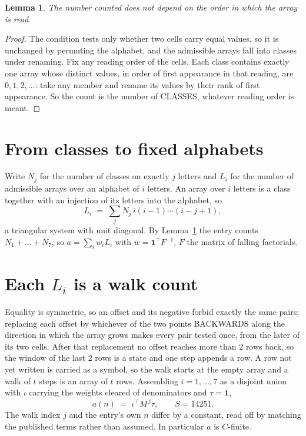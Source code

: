 \documentclass[11pt,a4paper]{article}
\theoremstyle{plain}
\newtheorem{lemma}[theorem]{Lemma}
\theoremstyle{definition}
\begin{document}
\begin{lemma}\label{lem:order}
The number counted does not depend on the order in which the array is read.
\end{lemma}

\begin{proof}
The condition tests only whether two cells carry equal values, so it is unchanged by permuting
the alphabet, and the admissible arrays fall into classes under renaming. Fix any reading order
of the cells. Each class contains exactly one array whose distinct values, in order of first
appearance in that reading, are $0,1,2,\dots$: take any member and rename its values by their
rank of first appearance. So the count is the number of CLASSES, whatever reading order is
meant.
\end{proof}

\section{From classes to fixed alphabets}

Write $N_j$ for the number of classes on exactly $j$ letters and $L_i$ for the number of
admissible arrays over an alphabet of $i$ letters. An array over $i$ letters is a class together
with an injection of its letters into the alphabet, so
\[
L_i\;=\;\sum_j N_j\,i(i-1)\cdots(i-j+1),
\]
a triangular system with unit diagonal. By Lemma~\ref{lem:order} the entry counts
$N_1+\dots+N_{7}$, so $a=\sum_i w_iL_i$ with $w=\mathbf{1}^{\!\top}F^{-1}$, $F$ the
matrix of falling factorials.

\section{Each $L_i$ is a walk count}

Equality is symmetric, so an offset and its negative forbid exactly the same pairs; replacing
each offset by whichever of the two points BACKWARDS along the direction in which the array
grows makes every pair tested once, from the later of its two cells. After that replacement no
offset reaches more than $2$ rows back, so the window of the last $2$
rows is a state and one step appends a row. A row not yet written is
carried as a symbol, so the walk starts at the empty array and a walk of $t$ steps is an array
of $t$ rows. Assembling $i=1,\dots,7$ as a disjoint union with $\iota$ carrying the
weights cleared of denominators and $\tau=\mathbf{1}$,
\[
a(n)\;=\;\iota^{\!\top}M^{\,j}\tau ,\qquad S=14251.
\]
The walk index $j$ and the entry's own $n$ differ by a constant, read off by matching the
published terms rather than assumed. In particular $a$ is $C$-finite.
\end{document}

